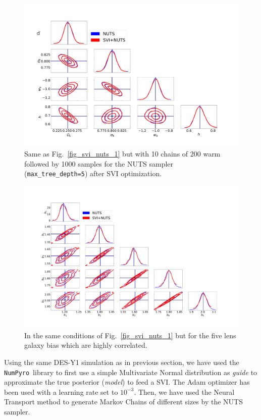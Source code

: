 \documentclass[final,5p,times,twocolumn,authoryear]{elsarticle}
\newcommand{\numpyro}{\texttt{NumPyro}}
\begin{document}
\begin{figure}
\includegraphics[width=\columnwidth]{figures/SVI_NUTS_10x200x1000.pdf}
\caption{Same as Fig.~\ref{fig_svi_nuts_1} but with 10 chains of 200 warm followed by 1000 samples for the NUTS sampler (\texttt{max\_tree\_depth=5}) after SVI optimization.}
\label{fig_svi_nuts_3}
\end{figure}

\begin{figure}
\includegraphics[width=\columnwidth]{figures/SVI_NUTS_1x200x200_bis.pdf}
\caption{In the same conditions of Fig.~\ref{fig_svi_nuts_1} but for the five lens galaxy bias which are highly correlated.}
\label{fig_svi_nuts_4}
\end{figure}


Using the same DES-Y1 simulation as in previous section, we have used the \numpyro\ library to first use a simple Multivariate Normal distribution as \textit{guide} to approximate the true posterior (\textit{model}) to feed a SVI. The Adam optimizer has been used with a learning rate set to $10^{-3}$.  Then, we have used the Neural Transport method to generate Markov Chains of different sizes by the NUTS sampler. 
\end{document}
